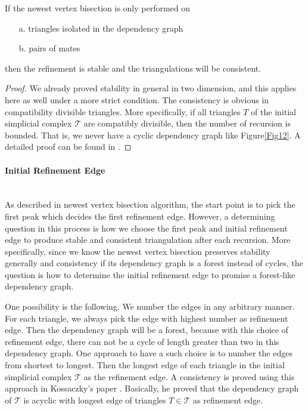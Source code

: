     \begin{lemma*}
    If the newest vertex bisection is only performed on 
    \begin{itemize}
        \item[a. ] triangles isolated in the dependency graph
        \item[b. ] pairs of mates
      \end{itemize}
    then the refinement is stable and the triangulations will be consistent.
    \end{lemma*}
    \begin{proof}
    We already proved stability in general in two dimension, and this applies here as well under a more strict condition. The consistency is obvious in compatibility divisible triangles. More specifically, if all triangles $T$ of the initial simplicial complex $\mathcal T$ are compatibly divisible, then the number of recursion is bounded. That is, we never have a cyclic dependency graph like Figure\ref{Fig12}. A detailed proof can be found in \cite{mitchell1988unified, mitchell1991adaptive}.
    \end{proof}

    \paragraph{Initial Refinement Edge}\mbox{}\\
    As described in newest vertex bisection algorithm, the start point is to pick the first peak which decides the first refinement edge. However, a determining question in this process is how we choose the first peak and initial refinement edge to produce stable and consistent triangulation after each recursion. More specifically, since we know the newest vertex bisection preserves stability generally and consistency if its dependency graph is a forest instead of cycles, the question is how to determine the initial refinement edge to promise a forest-like dependency graph. 

    One possibility is the following.
    We number the edges in any arbitrary manner. For each triangle, we always pick the edge with highest number as refinement edge. Then the dependency graph will be a forest, because with this choice of refinement edge, there can not be a cycle of length greater than two in this dependency graph.
    One approach to have a such choice is to number the edges from shortest to longest.
    Then the longest edge of each triangle in the initial simplicial complex $\mathcal T$ as the refinement edge. A consistency is proved using this approach in Kossaczky's paper \cite{kossaczky1994recursive}. Basically, he proved that the dependency graph of $\mathcal T$ is acyclic with longest edge of triangles $T\in\mathcal T$ as refinement edge.

